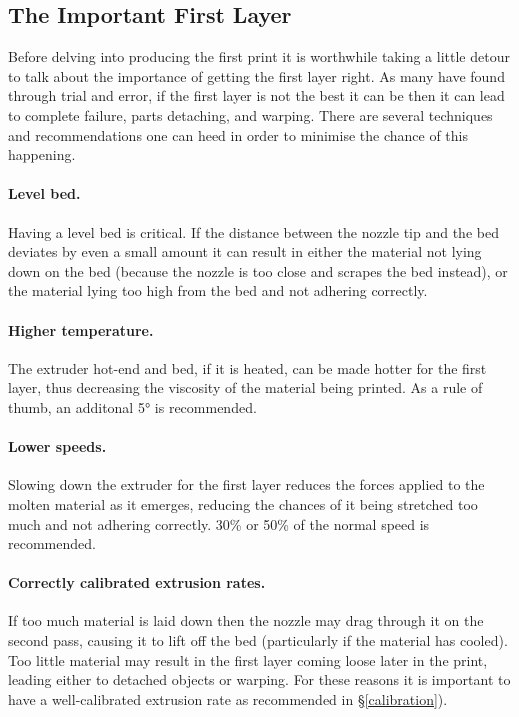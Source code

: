 
\subsection{The Important First Layer}
\label{sec:the_important_first_layer}
Before delving into producing the first print it is worthwhile taking a little detour to talk about the importance of getting the first layer right.  As many have found through trial and error, if the first layer is not the best it can be then it can lead to complete failure, parts detaching, and warping.  There are several techniques and recommendations one can heed in order to minimise the chance of this happening.

\paragraph{Level bed.} %
\label{par:level_bed}
Having a level bed is critical.  If the distance between the nozzle tip and the bed deviates by even a small amount it can result in either the material not lying down on the bed (because the nozzle is too close and scrapes the bed instead), or the material lying too high from the bed and not adhering correctly.

\paragraph{Higher temperature.} %
\label{par:higher_temperature}
The extruder hot-end and bed, if it is heated, can be made hotter for the first layer, thus decreasing the viscosity of the material being printed.  As a rule of thumb, an additonal 5° is recommended.

\paragraph{Lower speeds.} %
\label{par:lower_speeds}
Slowing down the extruder for the first layer reduces the forces applied to the molten material as it emerges, reducing the chances of it being stretched too much and not adhering correctly.  30\% or 50\% of the normal speed is recommended.

\paragraph{Correctly calibrated extrusion rates.} %
\label{par:correct_extrusion_settings}
If too much material is laid down then the nozzle may drag through it on the second pass, causing it to lift off the bed (particularly if the material has cooled).  Too little material may result in the first layer coming loose later in the print, leading either to detached objects or warping.  For these reasons it is important to have a well-calibrated extrusion rate as recommended in §\ref{calibration}).

